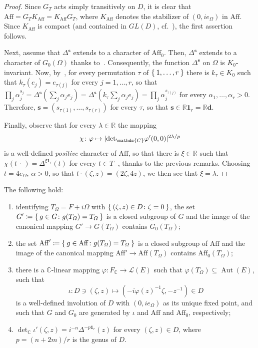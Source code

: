 \documentclass[10.5pt,reqno]{amsart}
\DeclareMathOperator{\Aut}{Aut}
\newcommand{\Aff}{\mathrm{Aff}}
\newcommand{\vect}[1]{\mathbf{{#1}}}
\DeclarePairedDelimiter{\abs}{\lvert}{\rvert}
\newcommand{\C}{\mathds{C}}
\newcommand{\R}{\mathds{R}}
\newcommand{\Lc}{\mathcal{L}}
\renewcommand{\phi}{\varphi}
\begin{document}
\begin{proof}
	Since $G_T$ acts simply transitively on $D$, it is clear that $\Aff=G_T K_\Aff=K_\Aff G_T$, where $K_\Aff$ denotes the stabilizer of $(0, i e_\Omega)$ in $\Aff$. Since $K_\Aff$ is compact (and contained in $GL(D)$, cf.~\cite[Theorem 1.13]{Kaneyuki}), the first assertion follows. 
	
	Next, assume that $\Delta^{\vect s}$ extends to a character of $\Aff_0$.   Then, $\Delta^{\vect s}$ extends to a character of $G_0(\Omega)$ thanks to~\cite[Proposition 4.1 of Chapter V]{Satake}. Consequently, the function $\Delta^{\vect s}$ on $\Omega$ is $K_0$-invariant. Now, by~\cite[Corollary IV.2.7]{FarautKoranyi}, for every permutation $\tau$ of   $\Set{1,\dots,r}$ there is $k_\tau\in K_0$ such that $k_\tau(e_j)=e_{\tau(j)}$ for every $j=1,\dots,r$, so that $\prod_j \alpha_j^{s_j}=\Delta^{\vect s}(\sum_j \alpha_j e_j)= \Delta^{\vect s}(k_\tau\sum_j \alpha_j e_j) =\prod_j \alpha_j^{s_{\tau(j)}}$ for every $\alpha_1,\dots,\alpha_r>0$. Therefore, $\vect s=(s_{\tau(1)},\dots,s_{\tau(r)})$ for every $\tau$, so that $\vect s\in \R\vect 1_r=\R\vect d$. 
	
	Finally, observe that for every $\lambda\in \R$  the mapping
	\[
	\chi\colon \phi\mapsto\abs{{\det}_\C \phi'(0,0)}^{2\lambda/p} 
	\]
	is a well-defined \emph{positive} character of $\Aff$, so that there is $\xi\in \R$ such that $\chi(t\,\cdot\,)=\Delta^{\xi\vect 1_r}(t)$ for every $t\in T_-$, thanks to the previous remarks. Choosing $t=4 e_\Omega$, $\alpha>0$, so that $t\cdot (\zeta,z)=(  2 \zeta, 4 z)$, we then see that $\xi=\lambda$.
\end{proof}

\begin{prop}\label{prop:15}
	The following hold:
	\begin{enumerate}
		\item[\textnormal{(1)}] identifying $T_\Omega=F+i\Omega$ with $\Set{(\zeta,z)\in D\colon \zeta=0}$, the set $G'\coloneqq \Set{g\in G\colon g(T_\Omega)=T_\Omega}$ is a closed subgroup of $G$ and the image of the canonical mapping $G'\to G(T_\Omega)$ contains $G_0(T_\Omega)$;
		
		\item[\textnormal{(1$'$)}]  the set $\Aff'\coloneqq \Set{g\in \Aff\colon g(T_\Omega)=T_\Omega}$ is a closed subgroup of $\Aff$ and the image of the canonical mapping $\Aff'\to \Aff(T_\Omega)$ contains $\Aff_0(T_\Omega)$;
		
		\item[\textnormal{(2)}] there is a $\C$-linear mapping $\phi\colon F_\C\to \Lc(E)$ such that  $\phi(T_\Omega)\subseteq\Aut(E)$, such that
		\[
		\iota\colon D\ni (\zeta,z)\mapsto (-i\phi(z)^{-1}\zeta,-z^{-1})\in D
		\]
		is a well-defined involution of $D$ with $(0,i e_\Omega)$ as its  unique fixed point, and such that $G$ and $G_0$ are generated by $\iota$ and $\Aff$ and $\Aff_0$, respectively;
		
		\item[\textnormal{(3)}]  $\det_\C \iota'(\zeta,z)= i^{-n}\Delta^{-p\vect 1_r}(z)$ for every $(\zeta,z)\in D$, where $p=(n+2m)/r$ is the genus of $D$.
	\end{enumerate}
\end{prop}
\end{document}

